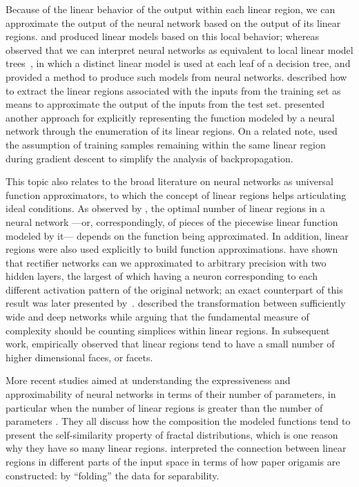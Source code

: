 Because of the linear behavior of the output within each linear region, 
we can approximate the output of the neural network based on the output of its linear regions. 
%
\cite{chu2018pwnn} and \cite{sudjianto2020unwrapping} produced linear models based on this local behavior; whereas 
\cite{glass2021relumot} observed that we can interpret neural networks as equivalent to local linear model trees~\citep{nelles2000lolimot}, in which a distinct linear model is used at each leaf of a decision tree, and provided a method to produce such models from neural networks.
\cite{tropex2021iclr} described how to extract the linear regions associated with the inputs from the training set as means to approximate the output of the inputs from the test set. 
\cite{robinson2019dissecting} presented another approach for explicitly representing the function modeled by a neural network through the enumeration of its linear regions. 
On a related note, 
\cite{chaudhry2020continual} used the assumption of training samples remaining within the same linear region during gradient descent to simplify the analysis of backpropagation.

This topic also relates to the broad literature on neural networks as universal function approximators, to which the concept of linear regions helps articulating ideal conditions. 
As observed by \cite{mhaskar2020approximation}, the optimal number of linear regions in a neural network ---or, correspondingly, of pieces of the piecewise linear function modeled by it--- depends on the function being approximated.
In addition, linear regions were also used explicitly to build function approximations. 
\cite{kumar2019equivalent} have shown that rectifier networks can we approximated to arbitrary precision with two hidden layers, the largest of which having a neuron corresponding to each different activation pattern of the original network; an exact counterpart of this result was later presented by~\cite{villani2023shallow}.
\cite{fan2020quasiequivalence} described the transformation between sufficiently wide and deep networks while arguing that the fundamental measure of complexity should be counting simplices within linear regions. 
In subsequent work, \cite{fan2023simple} empirically observed that linear regions tend to have a small number of higher dimensional faces, or facets.

More recent studies aimed at understanding the expressiveness and approximability of neural networks in terms of their number of parameters, 
in particular when the number of linear regions is greater than the number of parameters \citep{fractals2019neurips,fractals2020ieee,daubechies2022approximation}. 
They all discuss how the composition the modeled functions tend to present the self-similarity property of fractal distributions, 
which is one reason why they have so many linear regions. 
\cite{keup2022origami} interpreted the connection between linear regions in different parts of the input space in terms of how paper origamis are constructed: by ``folding'' the data for separability. 


